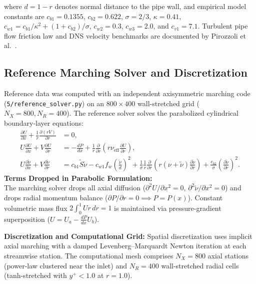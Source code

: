 \documentclass[11pt,a4paper]{article}
\begin{document}
where $d = 1 - r$ denotes normal distance to the pipe wall, and empirical model constants are $c_{b1} = 0.1355$, $c_{b2} = 0.622$, $\sigma = 2/3$, $\kappa = 0.41$, $c_{w1} = c_{b1}/\kappa^2 + (1+c_{b2})/\sigma$, $c_{w2} = 0.3$, $c_{w3} = 2.0$, and $c_{v1} = 7.1$. Turbulent pipe flow friction law and DNS velocity benchmarks are documented by Pirozzoli et al.~\cite[Eq.~(3.2), p.~7]{pirozzoli2021}.

\subsection{Reference Marching Solver and Discretization}
Reference data was computed with an independent axisymmetric marching code (\texttt{5/reference\_}\allowbreak\texttt{solver.py}) on an $800 \times 400$ wall-stretched grid ($N_X = 800, N_R = 400$). The reference solver solves the parabolized cylindrical boundary-layer equations:
\begin{align}
\frac{\partial U}{\partial x} + \frac{1}{r}\frac{\partial(r V)}{\partial r} &= 0, \\
U \frac{\partial U}{\partial x} + V \frac{\partial U}{\partial r} &= -\frac{dP}{dx} + \frac{1}{r}\frac{\partial}{\partial r}\left(r \nu_{\mathrm{eff}}\frac{\partial U}{\partial r}\right), \\
U \frac{\partial \tilde{\nu}}{\partial x} + V \frac{\partial \tilde{\nu}}{\partial r} &= c_{b1}\tilde{S}\tilde{\nu} - c_{w1}f_w\left(\frac{\tilde{\nu}}{d}\right)^2 + \frac{1}{\sigma}\frac{1}{r}\frac{\partial}{\partial r}\left(r (\nu+\tilde{\nu})\frac{\partial \tilde{\nu}}{\partial r}\right) + \frac{c_{b2}}{\sigma}\left(\frac{\partial \tilde{\nu}}{\partial r}\right)^2.
\end{align}
\noindent\textbf{Terms Dropped in Parabolic Formulation:}\\[0.2em]
The marching solver drops all axial diffusion ($\partial^2 U/\partial x^2 = 0$, $\partial^2 \tilde{\nu}/\partial x^2 = 0$) and drops radial momentum balance ($\partial P/\partial r = 0 \implies P = P(x)$). Constant volumetric mass flux $2\int_0^1 U r\,dr = 1$ is maintained via pressure-gradient superposition ($U = U_a - \frac{dP}{dx} U_b$).

\noindent\textbf{Discretization and Computational Grid:} Spatial discretization uses implicit axial marching with a damped Levenberg--Marquardt Newton iteration at each streamwise station. The computational mesh comprises $N_X = 800$ axial stations (power-law clustered near the inlet) and $N_R = 400$ wall-stretched radial cells (tanh-stretched with $y^+ < 1.0$ at $r=1.0$).
\end{document}
